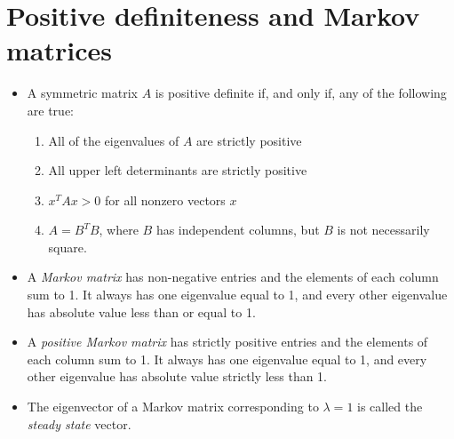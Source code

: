 \documentclass[11pt]{article}
\begin{document}
\section{Positive definiteness and Markov matrices}
\begin{itemize}
\item A symmetric matrix $A$ is positive definite if, and only if, any of the following are true:
\begin{enumerate}
\item All of the eigenvalues of $A$ are strictly positive
\item All upper left determinants are strictly positive
\item $x^TAx > 0 $ for all nonzero vectors $x$
\item $A = B^TB$, where $B$ has independent columns, but $B$ is not necessarily square.   
\end{enumerate}
\item A \emph{Markov matrix} has non-negative entries and the elements of each column sum to 1. It always has one eigenvalue equal to 1, and every other eigenvalue has absolute value less than or equal to 1.
\item A \emph{positive Markov matrix} has strictly positive entries and the elements of each column sum to 1. It always has one eigenvalue equal to 1, and every other eigenvalue has absolute value strictly less than 1.
\item The eigenvector of a Markov matrix corresponding to $\lambda = 1$ is called the \emph{steady state} vector.
\end{itemize}
\end{document}
